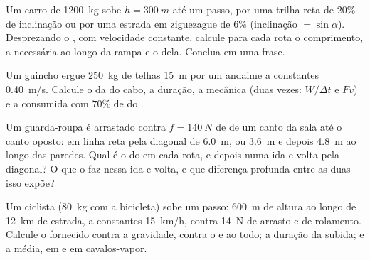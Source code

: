 \begin{exercise}[$\star\star\star$]\label{exo:g11:work-of-force:12}
Um carro de \qty{1200}{kg} sobe $h = \qty{300}{m}$ até um passo, por uma
trilha reta de $20\%$ de inclinação ou por uma estrada em ziguezague de
$6\%$ (inclinação $= \sin\alpha$). Desprezando o , com velocidade
constante, calcule para cada rota o comprimento, a  necessária ao
longo da rampa e o  dela. Conclua em uma frase.
\end{exercise}

\begin{exercise}[$\star\star\star$]\label{exo:g11:work-of-force:13}
Um guincho ergue \qty{250}{kg} de telhas \qty{15}{m} por um andaime a
constantes \qty{0.40}{m/s}. Calcule o  da  do cabo, a
duração, a  mecânica (duas vezes: $W/\Delta t$ e $Fv$) e a
 consumida com $70\%$ de  do .
\end{exercise}

\begin{exercise}[$\star\star\star$]\label{exo:g11:work-of-force:14}
Um guarda-roupa é arrastado contra $f = \qty{140}{N}$ de  de um
canto da sala até o canto oposto: em linha reta pela diagonal de
\qty{6.0}{m}, ou \qty{3.6}{m} e depois \qty{4.8}{m} ao longo das
paredes. Qual é o  do  em cada rota, e depois numa ida e
volta pela diagonal? O que o  faz nessa ida e volta, e que diferença
profunda entre as duas  isso expõe?
\end{exercise}

\begin{exercise}[$\star\star\star$]\label{exo:g11:work-of-force:15}
Um ciclista (\qty{80}{kg} com a bicicleta) sobe um passo: \qty{600}{m} de
altura ao longo de \qty{12}{km} de estrada, a constantes \qty{15}{km/h},
contra \qty{14}{N} de arrasto e  de rolamento. Calcule o
 fornecido contra a gravidade, contra o  e ao todo; a
duração da subida; e a  média, em  e em cavalos-vapor.
\end{exercise}

